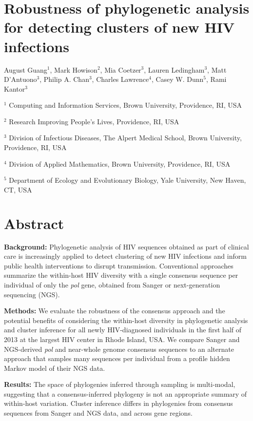 \documentclass[letterpaper]{article}
\begin{document}
\section*{Robustness of phylogenetic analysis for detecting clusters of new HIV infections}

August Guang$^1$, Mark Howison$^2$, Mia Coetzer$^3$, Lauren Ledingham$^3$, Matt D'Antuono$^3$,
Philip A. Chan$^3$, Charles Lawrence$^4$, Casey W. Dunn$^5$, Rami Kantor$^3$

$^1$ Computing and Information Services, Brown University, Providence, RI, USA

$^2$ Research Improving People's Lives, Providence, RI, USA

$^3$ Division of Infectious Diseases, The Alpert Medical School, Brown University, Providence, RI, USA

$^4$ Division of Applied Mathematics, Brown University, Providence, RI, USA

$^5$ Department of Ecology and Evolutionary Biology, Yale University, New Haven, CT, USA

\doublespace
\linenumbers
\section*{Abstract}

\textbf{Background:} Phylogenetic analysis of HIV sequences obtained as part of clinical care is increasingly applied to detect clustering of new HIV infections and inform public health interventions to disrupt transmission. Conventional approaches summarize the within-host HIV diversity with a single consensus sequence per individual of only the \emph{pol} gene, obtained from Sanger or next-generation sequencing (NGS).

\textbf{Methods:} We evaluate the robustness of the consensus approach and the potential benefits of considering the within-host diversity in phylogenetic analysis and cluster inference for all newly HIV-diagnosed individuals in the first half of 2013 at the largest HIV center in Rhode Island, USA. We compare Sanger and NGS-derived \emph{pol} and near-whole genome consensus sequences to an alternate approach that samples many sequences per individual from a profile hidden Markov model of their NGS data.

\textbf{Results:} The space of phylogenies inferred through sampling is multi-modal, suggesting that a consensus-inferred phylogeny is not an appropriate summary of within-host variation. Cluster inference differs in phylogenies from consensus sequences from Sanger and NGS data, and across gene regions.
\end{document}
